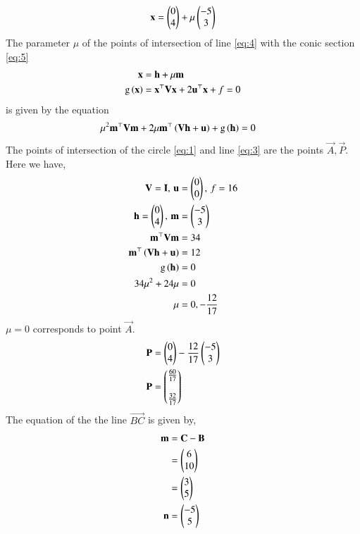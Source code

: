 \documentclass[journal,12pt,twocolumn]{IEEEtran}
\begin{document}
\begin{enumerate}
\begin{align}
\mathbf{x} = \begin{pmatrix}0\\4\end{pmatrix} + \mu \begin{pmatrix}-5\\3\end{pmatrix}
\end{align}
The parameter $\mu$ of the points of intersection of line \eqref{eq:4} with the conic section \eqref{eq:5}
\begin{align}
\mathbf{x} &= \mathbf{h} + \mu \mathbf{m}
\label{eq:4}\\
\text{g}\left(\mathbf{x}\right) &= \mathbf{x}^{\top}\mathbf{V}\mathbf{x}+2\mathbf{u}^{\top}\mathbf{x}+f=0
\label{eq:5}
\end{align}
is given by the equation 
\begin{align}
\mu^2\mathbf{m}^{\top}\mathbf{V}\mathbf{m} + 2 \mu\mathbf{m}^{\top}\left(\mathbf{V}\mathbf{h}+\mathbf{u}\right) + \text{g}\left(\mathbf{h}\right) &=0
\label{eq:6}
\end{align}
The points of intersection of the circle \eqref{eq:1} and line \eqref{eq:3} are the points $\vec{A}, \vec{P}$. Here we have,
\begin{align}
\mathbf{V} = \mathbf{I}, \, \mathbf{u} &= \begin{pmatrix}0\\0\end{pmatrix}, \, f = 16\\
\mathbf{h} = \begin{pmatrix}0\\4\end{pmatrix}, \, \mathbf{m} &= \begin{pmatrix}-5\\3\end{pmatrix}\\
\mathbf{m}^{\top}\mathbf{V}\mathbf{m} &= 34\\
\mathbf{m}^{\top}\left(\mathbf{V}\mathbf{h}+\mathbf{u}\right) &= 12\\
\text{g}\left(\mathbf{h}\right) &= 0\\
34\mu^2 + 24 \mu &= 0\\
\mu &= 0, -\frac{12}{17}
\end{align}
$\mu = 0$ corresponds to point $\vec{A}$.
\begin{align}
\mathbf{P} &= \begin{pmatrix}0\\4\end{pmatrix} -\frac{12}{17} \begin{pmatrix}-5\\3\end{pmatrix}\\
\mathbf{P} &= \begin{pmatrix}\frac{60}{17}\\\\\frac{32}{17}\end{pmatrix}
\end{align}
The equation of the the line $\vec{BC}$ is given by,
\begin{align}
\vec{m} &= \vec{C}-\vec{B}\\
&= \myvec{6\\10}\\
&= \myvec{3\\5}\\
\vec{n} &= \myvec{-5\\5}\\

\end{align}
\end{enumerate}
\end{document}
